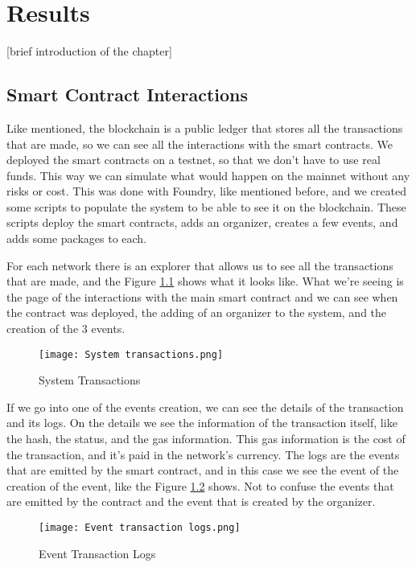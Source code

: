 \chapter{Results}
\label{chap:results}

[brief introduction of the chapter]

\section{Smart Contract Interactions}
\label{sec:smart_contract_interactions}

Like mentioned, the blockchain is a public ledger that stores all the transactions that are made, so we can see all the interactions with the smart contracts. We deployed the smart contracts on a testnet, so that we don't have to use real funds. This way we can simulate what would happen on the mainnet without any risks or cost. This was done with Foundry, like mentioned before, and we created some scripts to populate the system to be able to see it on the blockchain. These scripts deploy the smart contracts, adds an organizer, creates a few events, and adds some packages to each.

For each network there is an explorer that allows us to see all the transactions that are made, and the Figure \ref{fig:system_transactions} shows what it looks like. What we're seeing is the page of the interactions with the main smart contract and we can see when the contract was deployed, the adding of an organizer to the system, and the creation of the 3 events.

\begin{figure}[H]
    \texttt{[image: System transactions.png]}
    \centering
    \caption{System Transactions}
    \label{fig:system_transactions}
\end{figure}

If we go into one of the events creation, we can see the details of the transaction and its logs. On the details we see the information of the transaction itself, like the hash, the status, and the gas information. This gas information is the cost of the transaction, and it's paid in the network's currency. The logs are the events that are emitted by the smart contract, and in this case we see the event of the creation of the event, like the Figure \ref{fig:event_transaction_logs} shows. Not to confuse the events that are emitted by the contract and the event that is created by the organizer.

\begin{figure}[H]
    \texttt{[image: Event transaction logs.png]}
    \centering
    \caption{Event Transaction Logs}
    \label{fig:event_transaction_logs}
\end{figure}

